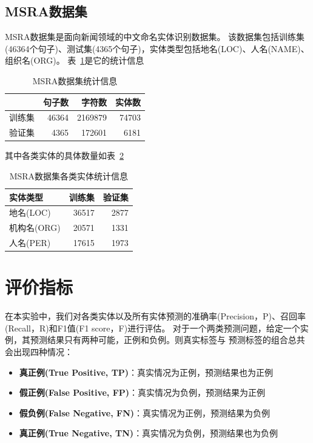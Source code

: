 \subsection{MSRA数据集}
MSRA数据集是面向新闻领域的中文命名实体识别数据集。
该数据集包括训练集(46364个句子)、测试集(4365个句子)，实体类型包括地名(LOC)、人名(NAME)、组织名(ORG)。
表~\ref{tab:MSRA_ner}是它的统计信息

\begin{table}[!hpt]
    \caption[MSRA数据集统计信息]{MSRA数据集统计信息}
    \label{tab:MSRA_ner}
    \centering
    \begin{tabular}{lrrr} \toprule
     &  句子数 & 字符数 & 实体数 \\ \midrule
    训练集 & 46364 & 2169879 & 74703 \\
    验证集 & 4365 & 172601 & 6181 \\ \bottomrule
    \end{tabular}
\end{table}

其中各类实体的具体数量如表~\ref{tab:MSRA_ner_entity_class}

\begin{table}[!hpt]
    \caption[MSRA数据集各类实体统计信息]{MSRA数据集各类实体统计信息}
    \label{tab:MSRA_ner_entity_class}
    \centering
    \begin{tabular}{lrr} \toprule
    实体类型 & 训练集 & 验证集 \\ \midrule
    地名(LOC) & 36517 & 2877 \\
    机构名(ORG) & 20571 & 1331 \\
    人名(PER) & 17615 & 1973 \\ \bottomrule
    \end{tabular}
\end{table}

\section{评价指标}

在本实验中，我们对各类实体以及所有实体预测的准确率(Precision，P)、召回率(Recall，R)和F1值(F1 score，F)进行评估。
对于一个两类预测问题，给定一个实例，其预测结果只有两种可能，正例和负例。则真实标签与
预测标签的组合总共会出现四种情况：

\begin{itemize}
    \item \textbf{真正例(True Positive, TP)}：真实情况为正例，预测结果也为正例
    \item \textbf{假正例(False Positive, FP)}：真实情况为负例，预测结果为正例
    \item \textbf{假负例(False Negative, FN)}：真实情况为正例，预测结果为负例
    \item \textbf{真正例(True Negative, TN)}：真实情况为负例，预测结果也为负例
\end{itemize}

